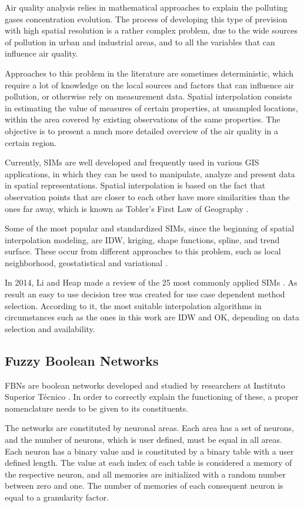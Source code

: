 Air quality analysis relies in mathematical approaches to explain the polluting gases concentration evolution. The process of developing this type of prevision with high spatial resolution is a rather complex problem, due to the wide sources of pollution in urban and industrial areas, and to all the variables that can influence air quality.

Approaches to this problem in the literature are sometimes deterministic, which require a lot of knowledge on the local sources and factors that can influence air pollution, or otherwise rely on measurement data. Spatial interpolation consists in estimating the value of measures of certain properties, at unsampled locations, within the area covered by existing observations of the same properties. The objective is to present a much more detailed overview of the air quality in a certain region.

Currently, SIMs are well developed and frequently used in various \ac{GIS} applications, in which they can be used to manipulate, analyze and present data in spatial representations. Spatial interpolation is based on the fact that observation points that are closer to each other have more similarities than the ones far away, which is known as Tobler’s First Law of Geography \cite{Stein1994}.

Some of the most popular and standardized SIMs, since the beginning of spatial interpolation modeling, are \ac{IDW}, kriging, shape functions, spline, and trend surface. These occur from different approaches to this problem, such as local neighborhood, geostatistical and variational \cite{Li2008}.

In 2014, Li and Heap made a review of the 25 most commonly applied SIMs \cite{Li2014}. As result an easy to use decision tree was created for use case dependent method selection. According to it, the most suitable interpolation algorithms in circumstances such as the ones in this work are IDW and \ac{OK}, depending on data selection and availability.

\subsection{Fuzzy Boolean Networks}

FBNs are boolean networks developed and studied by researchers at Instituto Superior Técnico \cite{Tome}. 
In order to correctly explain the functioning of these, a proper nomenclature needs to be given to its constituents.

The networks are constituted by neuronal areas. Each area has a set of neurons, and the number of neurons, which is user defined, must be equal in all areas. Each neuron has a binary value and is constituted by a binary table with a user defined length. The value at each index of each table is considered a memory of the respective neuron, and all memories are initialized with a random number between zero and one. The number of memories of each consequent neuron is equal to a granularity factor.

